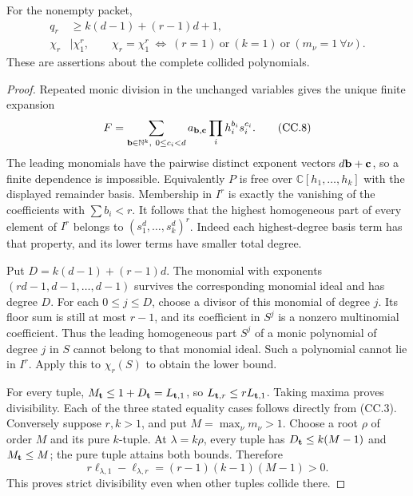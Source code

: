 \begin{proposition}
For the nonempty packet,
\[
\begin{split}
 q_r&\geq k(d-1)+(r-1)d+1,\\
 \chi_r&\mid\chi_1^r,\qquad
 \chi_r=\chi_1^r
 \ \Longleftrightarrow\
 (r=1)\ \text{or}\ (k=1)\ \text{or}\ (m_\nu=1\ \forall\nu).
\end{split}
\tag{CC.7}
\]
These are assertions about the complete collided polynomials.
\end{proposition}
\begin{proof}
Repeated monic division in the unchanged variables gives the unique
finite expansion
\[
 F=\sum_{{\bf b}\in\mathbb N^k,\ 0\leq c_i<d}
 a_{{\bf b},{\bf c}}\prod_i h_i^{b_i}s_i^{c_i}.
 \tag{CC.8}
\]
The leading monomials have the pairwise distinct exponent vectors
\(d{\bf b}+{\bf c}\), so a finite dependence is impossible.
Equivalently \(P\) is free over \(\mathbb C[h_1,\ldots,h_k]\)
with the displayed remainder basis.  Membership in \(I^r\)
is exactly the vanishing of the coefficients with \(\sum b_i<r\).
It follows that the highest homogeneous part of every element of
\(I^r\) belongs to \((s_1^d,\ldots,s_k^d)^r\).
Indeed each highest-degree basis term has that property, and its
lower terms have smaller total degree.

Put \(D=k(d-1)+(r-1)d\).
The monomial with exponents \((rd-1,d-1,\ldots,d-1)\) survives the
corresponding monomial ideal and has degree \(D\).
For each \(0\leq j\leq D\), choose a divisor of this monomial of
degree \(j\).  Its floor sum is still at most \(r-1\), and its
coefficient in \(S^j\) is a nonzero multinomial coefficient.
Thus the leading homogeneous part \(S^j\) of a monic polynomial
of degree \(j\) in \(S\) cannot belong to that monomial ideal.
Such a polynomial cannot lie in \(I^r\).  Apply this to \(\chi_r(S)\)
to obtain the lower bound.

For every tuple, \(M_{\bf t}\leq1+D_{\bf t}=L_{{\bf t},1}\), so
\(L_{{\bf t},r}\leq rL_{{\bf t},1}\).
Taking maxima proves divisibility.  Each of the three stated
equality cases follows directly from (CC.3).
Conversely suppose \(r,k>1\), and put \(M=\max_\nu m_\nu>1\).
Choose a root \(\rho\) of order \(M\) and its pure \(k\)-tuple.
At \(\lambda=k\rho\), every tuple has
\(D_{\bf t}\leq k(M-1)\) and \(M_{\bf t}\leq M\);
the pure tuple attains both bounds.  Therefore
\[
 r\ell_{\lambda,1}-\ell_{\lambda,r}
 =(r-1)(k-1)(M-1)>0.
 \tag{CC.9}
\]
This proves strict divisibility even when other tuples collide there.
\end{proof}

